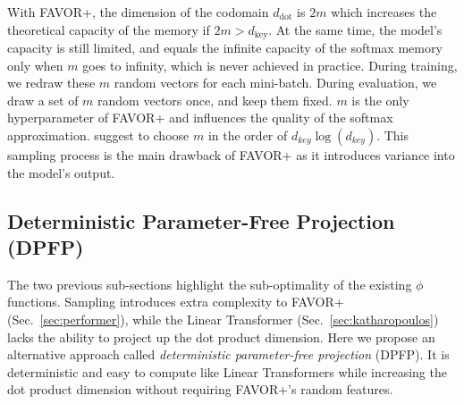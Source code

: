 \documentclass{article}
\theoremstyle{definition}
\begin{document}
With FAVOR+, the dimension of the codomain $d_\text{dot}$ is $2m$ which increases the theoretical capacity of the memory if $2m > d_\text{key}$. 
At the same time, the model's capacity is still limited, and equals the infinite capacity of the softmax memory only when $m$ goes to infinity, which is never achieved in practice.
During training, we redraw these $m$ random vectors for each mini-batch.
During evaluation, we draw a set of $m$ random vectors once, and keep them fixed.
$m$ is the only hyperparameter of FAVOR+ and influences the quality of the softmax approximation. 
\citet{choromanski2020rethinking} suggest to choose $m$ in the order of $d_\textit{key}\log(d_\textit{key})$.
This sampling process is the main drawback of FAVOR+ as it introduces variance into the model's output.


\subsection{Deterministic Parameter-Free Projection (DPFP)}
\label{sec:phi}
The two previous sub-sections highlight the sub-optimality of the existing $\phi$ functions.
Sampling introduces extra complexity to FAVOR+ (Sec.~\ref{sec:performer}),
while the Linear Transformer (Sec.~\ref{sec:katharopoulos}) lacks the ability to project up the dot product dimension.
Here we propose an alternative approach called \textit{deterministic parameter-free projection} (DPFP).
It is deterministic and easy to compute like Linear Transformers
while increasing the dot product dimension
without requiring FAVOR+'s random features.
\end{document}
